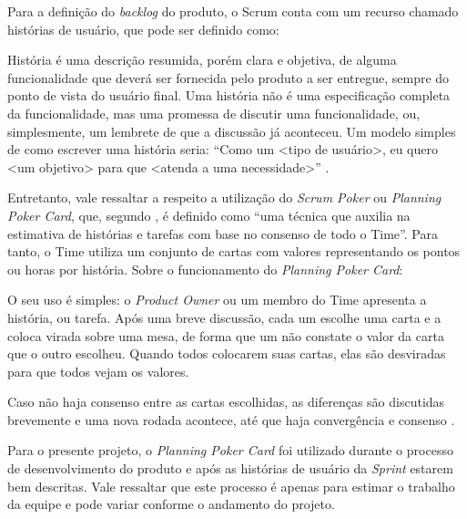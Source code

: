 Para a definição do \textsl{backlog} do produto, o Scrum conta com um recurso chamado histórias de usuário, que pode ser definido como: 

\begin{citacao}
História é uma descrição resumida, porém clara e objetiva, de alguma funcionalidade que deverá ser fornecida pelo produto a ser entregue, sempre do ponto de vista do usuário final. Uma história não é uma especificação completa da funcionalidade, mas uma promessa de discutir uma funcionalidade, ou, simplesmente, um lembrete de que a discussão já aconteceu. Um modelo simples de como escrever uma história seria: ``Como um <tipo de usuário>, eu quero <um objetivo> para que <atenda a uma necessidade>'' \cite{cruz:2018}.
\end{citacao}


Entretanto, vale ressaltar a respeito a utilização do \textsl{Scrum Poker} ou \textsl{Planning Poker Card}, que, segundo , é definido como ``uma técnica que auxilia na estimativa de histórias e tarefas com base no consenso de todo o Time''. Para tanto, o Time utiliza um conjunto de cartas com valores representando os pontos ou horas por história. Sobre o funcionamento do \textsl{Planning Poker Card}:

\begin{citacao}
O seu uso é simples: o \textsl{Product Owner} ou um membro do Time apresenta a história, ou tarefa. Após uma breve discussão, cada um escolhe uma carta e a coloca virada sobre uma mesa, de forma que um não constate o valor da carta que o outro escolheu. Quando todos colocarem suas cartas, elas são desviradas para que todos vejam os valores.

Caso não haja consenso entre as cartas escolhidas, as diferenças são discutidas brevemente e uma nova rodada acontece, até que haja convergência e consenso \cite{cruz:2018}.
\end{citacao}

Para o presente projeto, o \textsl{Planning Poker Card} foi utilizado durante o processo de desenvolvimento do produto e após as histórias de usuário da \textsl{Sprint} estarem bem descritas. Vale ressaltar que este processo é apenas para estimar o trabalho da equipe e pode variar conforme o andamento do projeto.

